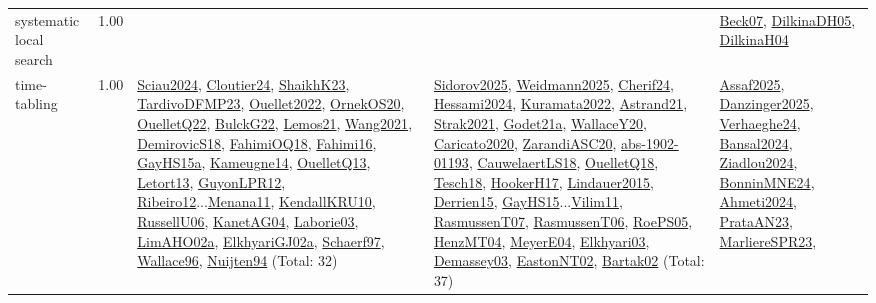 {\begin{longtable}{p{3cm}r>{\raggedright\arraybackslash}p{6cm}>{\raggedright\arraybackslash}p{6cm}>{\raggedright\arraybackslash}p{8cm}}
\index{systematic local search}\index{Algorithms!systematic local search}systematic local search &  1.00 &  &  & \hyperref[detail:Beck07]{Beck07}, \hyperref[detail:DilkinaDH05]{DilkinaDH05}, \hyperref[detail:DilkinaH04]{DilkinaH04}\\
\index{time-tabling}\index{Algorithms!time-tabling}time-tabling &  1.00 & \hyperref[detail:Sciau2024]{Sciau2024}, \hyperref[detail:Cloutier24]{Cloutier24}, \hyperref[detail:ShaikhK23]{ShaikhK23}, \hyperref[detail:TardivoDFMP23]{TardivoDFMP23}, \hyperref[detail:Ouellet2022]{Ouellet2022}, \hyperref[detail:OrnekOS20]{OrnekOS20}, \hyperref[detail:OuelletQ22]{OuelletQ22}, \hyperref[detail:BulckG22]{BulckG22}, \hyperref[detail:Lemos21]{Lemos21}, \hyperref[detail:Wang2021]{Wang2021}, \hyperref[detail:DemirovicS18]{DemirovicS18}, \hyperref[detail:FahimiOQ18]{FahimiOQ18}, \hyperref[detail:Fahimi16]{Fahimi16}, \hyperref[detail:GayHS15a]{GayHS15a}, \hyperref[detail:Kameugne14]{Kameugne14}, \hyperref[detail:OuelletQ13]{OuelletQ13}, \hyperref[detail:Letort13]{Letort13}, \hyperref[detail:GuyonLPR12]{GuyonLPR12}, \hyperref[detail:Ribeiro12]{Ribeiro12}...\hyperref[detail:Menana11]{Menana11}, \hyperref[detail:KendallKRU10]{KendallKRU10}, \hyperref[detail:RussellU06]{RussellU06}, \hyperref[detail:KanetAG04]{KanetAG04}, \hyperref[detail:Laborie03]{Laborie03}, \hyperref[detail:LimAHO02a]{LimAHO02a}, \hyperref[detail:ElkhyariGJ02a]{ElkhyariGJ02a}, \hyperref[detail:Schaerf97]{Schaerf97}, \hyperref[detail:Wallace96]{Wallace96}, \hyperref[detail:Nuijten94]{Nuijten94} (Total: 32) & \hyperref[detail:Sidorov2025]{Sidorov2025}, \hyperref[detail:Weidmann2025]{Weidmann2025}, \hyperref[detail:Cherif24]{Cherif24}, \hyperref[detail:Hessami2024]{Hessami2024}, \hyperref[detail:Kuramata2022]{Kuramata2022}, \hyperref[detail:Astrand21]{Astrand21}, \hyperref[detail:Strak2021]{Strak2021}, \hyperref[detail:Godet21a]{Godet21a}, \hyperref[detail:WallaceY20]{WallaceY20}, \hyperref[detail:Caricato2020]{Caricato2020}, \hyperref[detail:ZarandiASC20]{ZarandiASC20}, \hyperref[detail:abs-1902-01193]{abs-1902-01193}, \hyperref[detail:CauwelaertLS18]{CauwelaertLS18}, \hyperref[detail:OuelletQ18]{OuelletQ18}, \hyperref[detail:Tesch18]{Tesch18}, \hyperref[detail:HookerH17]{HookerH17}, \hyperref[detail:Lindauer2015]{Lindauer2015}, \hyperref[detail:Derrien15]{Derrien15}, \hyperref[detail:GayHS15]{GayHS15}...\hyperref[detail:Vilim11]{Vilim11}, \hyperref[detail:RasmussenT07]{RasmussenT07}, \hyperref[detail:RasmussenT06]{RasmussenT06}, \hyperref[detail:RoePS05]{RoePS05}, \hyperref[detail:HenzMT04]{HenzMT04}, \hyperref[detail:MeyerE04]{MeyerE04}, \hyperref[detail:Elkhyari03]{Elkhyari03}, \hyperref[detail:Demassey03]{Demassey03}, \hyperref[detail:EastonNT02]{EastonNT02}, \hyperref[detail:Bartak02]{Bartak02} (Total: 37) & \hyperref[detail:Assaf2025]{Assaf2025}, \hyperref[detail:Danzinger2025]{Danzinger2025}, \hyperref[detail:Verhaeghe24]{Verhaeghe24}, \hyperref[detail:Bansal2024]{Bansal2024}, \hyperref[detail:Ziadlou2024]{Ziadlou2024}, \hyperref[detail:BonninMNE24]{BonninMNE24}, \hyperref[detail:Ahmeti2024]{Ahmeti2024}, \hyperref[detail:PrataAN23]{PrataAN23}, \hyperref[detail:MarliereSPR23]{MarliereSPR23}, 
\end{longtable}}
